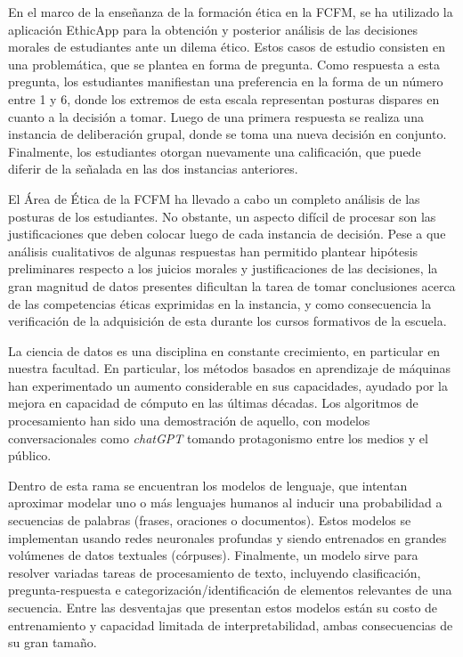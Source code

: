\documentclass[
	spanish, %
	letterpaper, oneside
]{article}
\begin{document}
	
\templatePagecfg

\templateFinalcfg


\inserttitle


En el marco de la enseñanza de la formación ética en la FCFM, se ha utilizado la aplicación EthicApp para la obtención y posterior análisis de las decisiones morales de estudiantes ante un dilema ético. Estos casos de estudio consisten en una problemática, que se plantea en forma de pregunta. Como respuesta a esta pregunta, los estudiantes manifiestan una preferencia en la forma de un número entre 1 y 6, donde los extremos de esta escala representan posturas dispares en cuanto a la decisión a tomar. Luego de una primera respuesta se realiza una instancia de deliberación grupal, donde se toma una nueva decisión en conjunto. Finalmente, los estudiantes otorgan nuevamente una calificación, que puede diferir de la señalada en las dos instancias anteriores.

\newp El Área de Ética de la FCFM ha llevado a cabo un completo análisis de las posturas de los estudiantes. No obstante, un aspecto difícil de procesar son las justificaciones que deben colocar luego de cada instancia de decisión. Pese a que análisis cualitativos de algunas respuestas han permitido plantear hipótesis preliminares respecto a los juicios morales y justificaciones de las decisiones, la gran magnitud de datos presentes dificultan la tarea de tomar conclusiones acerca de las competencias éticas exprimidas en la instancia, y como consecuencia la verificación de la adquisición de esta durante los cursos formativos de la escuela.



La ciencia de datos es una disciplina en constante crecimiento, en particular en nuestra facultad. En particular, los métodos basados en aprendizaje de máquinas han experimentado un aumento considerable en sus capacidades, ayudado por la mejora en capacidad de cómputo en las últimas décadas. Los algoritmos de procesamiento han sido una demostración de aquello, con modelos conversacionales como \textit{chatGPT} tomando protagonismo entre los medios y el público. 

\newp Dentro de esta rama se encuentran los modelos de lenguaje, que intentan aproximar modelar uno o más lenguajes humanos al inducir una probabilidad a secuencias de palabras (frases, oraciones o documentos). Estos modelos se implementan usando redes neuronales profundas y siendo entrenados en grandes volúmenes de datos textuales (córpuses). Finalmente, un modelo sirve para resolver variadas tareas de procesamiento de texto, incluyendo clasificación, pregunta-respuesta e categorización/identificación de elementos relevantes de una secuencia. Entre las desventajas que presentan estos modelos están su costo de entrenamiento y capacidad limitada de interpretabilidad, ambas consecuencias de su gran tamaño.
\end{document}
